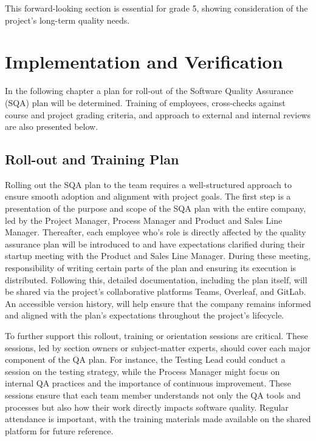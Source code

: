 \documentclass{article}
\begin{document}
This forward-looking section is essential for grade 5, showing consideration of the project's long-term quality needs.

\newpage
\section{Implementation and Verification}
In the following chapter a plan for roll-out of the Software Quality Assurance (SQA) plan will be determined. Training of employees, cross-checks against course and project grading criteria, and approach to external and internal reviews are also presented below. 

\subsection{Roll-out and Training Plan}
Rolling out the SQA plan to the team requires a well-structured approach to ensure smooth adoption and alignment with project goals. The first step is a presentation of the purpose and scope of the SQA plan with the entire company, led by the Project Manager, Process Manager and Product and Sales Line Manager. Thereafter, each employee who's role is directly affected by the quality assurance plan will be introduced to and have expectations clarified during their startup meeting with the Product and Sales Line Manager. During these meeting, responsibility of writing certain parts of the plan and ensuring its execution is distributed. Following this, detailed documentation, including the plan itself, will be shared via the project's collaborative platforms Teams, Overleaf, and GitLab. An accessible version history, will help ensure that the company remains informed and aligned with the plan's expectations throughout the project's lifecycle.

To further support this rollout, training or orientation sessions are critical. These sessions, led by section owners or subject-matter experts, should cover each major component of the QA plan. For instance, the Testing Lead could conduct a session on the testing strategy, while the Process Manager might focus on internal QA practices and the importance of continuous improvement. These sessions ensure that each team member understands not only the QA tools and processes but also how their work directly impacts software quality. Regular attendance is important, with the training materials made available on the shared platform for future reference.
\end{document}
